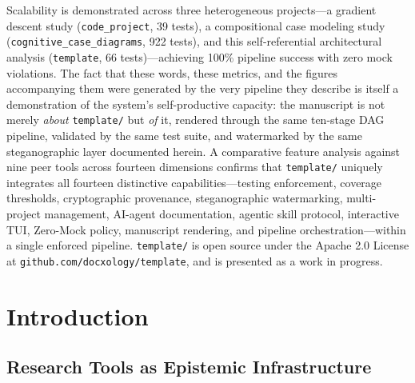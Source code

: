 \documentclass[
]{article}
\begin{document}
Scalability is demonstrated across three heterogeneous projects---a
gradient descent study (\texttt{code\_project}, 39 tests), a
compositional case modeling study (\texttt{cognitive\_case\_diagrams},
922 tests), and this self-referential architectural analysis
(\texttt{template}, 66 tests)---achieving 100\% pipeline success with
zero mock violations. The fact that these words, these metrics, and the
figures accompanying them were generated by the very pipeline they
describe is itself a demonstration of the system's self-productive
capacity: the manuscript is not merely \emph{about} \texttt{template/}
but \emph{of} it, rendered through the same ten-stage DAG pipeline,
validated by the same test suite, and watermarked by the same
steganographic layer documented herein. A comparative feature analysis
against nine peer tools across fourteen dimensions confirms that
\texttt{template/} uniquely integrates all fourteen distinctive
capabilities---testing enforcement, coverage thresholds, cryptographic
provenance, steganographic watermarking, multi-project management,
AI-agent documentation, agentic skill protocol, interactive TUI,
Zero-Mock policy, manuscript rendering, and pipeline
orchestration---within a single enforced pipeline. \texttt{template/} is
open source under the Apache 2.0 License at
\texttt{github.com/docxology/template}, and is presented as a work in
progress.

\newpage

\section{Introduction}\label{introduction}

\subsection{Research Tools as Epistemic
Infrastructure}\label{research-tools-as-epistemic-infrastructure}
\end{document}
